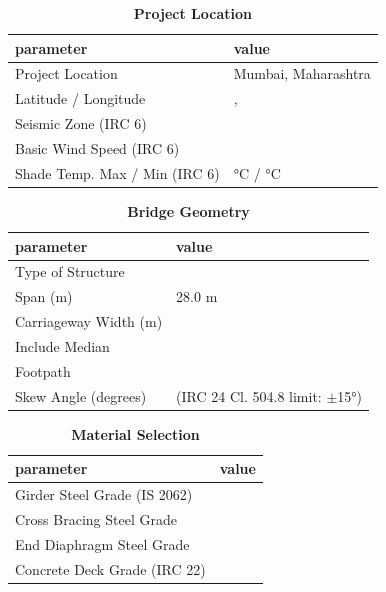 \documentclass[12pt,a4paper]{report}
\numberwithin{table}{chapter}
\numberwithin{figure}{chapter}
\begin{document}
\begin{table}[H]
\caption{\textbf{Project Location}}
\label{subsec:project-location}
\begin{tabular}{|L{5.5cm}|L{8.5cm}|}
\hline
\textbf{parameter} & \textbf{value} \\
\hline
\textnormal{Project Location} & Mumbai, Maharashtra \\
\hline
\textnormal{Latitude / Longitude} & ,  \\
\hline
\textnormal{Seismic Zone (IRC 6)} &  \\
\hline
\textnormal{Basic Wind Speed (IRC 6)} &  \\
\hline
\textnormal{Shade Temp. Max / Min (IRC 6)} &  °C /  °C \\
\hline
\end{tabular}
\vspace{0.4cm}
\end{table}

\begin{table}[H]
\caption{\textbf{Bridge Geometry}}
\label{subsec:bridge-geometry}
\begin{tabular}{|L{5.5cm}|L{8.5cm}|}
\hline
\textbf{parameter} & \textbf{value} \\
\hline
\textnormal{Type of Structure} &  \\
\hline
\textnormal{Span (m)} & 28.0 m \\
\hline
\textnormal{Carriageway Width (m)} &  \\
\hline
\textnormal{Include Median} &  \\
\hline
\textnormal{Footpath} &  \\
\hline
\textnormal{Skew Angle (degrees)} &  (IRC 24 Cl. 504.8 limit: $\pm$15°) \\
\hline
\end{tabular}
\end{table}
\vspace{0.4cm}

\begin{table}[H]
\caption{\textbf{Material Selection}}
\label{subsec:material}
\begin{tabular}{|L{5.5cm}|L{8.5cm}|}
\hline
\textbf{parameter} & \textbf{value} \\
\hline
\textnormal{Girder Steel Grade (IS 2062)} &  \\
\hline
\textnormal{Cross Bracing Steel Grade} &  \\
\hline
\textnormal{End Diaphragm Steel Grade} &  \\
\hline
\textnormal{Concrete Deck Grade (IRC 22)} &  \\
\hline
\end{tabular}
\end{table}
\vspace{0.4cm}
\end{document}
